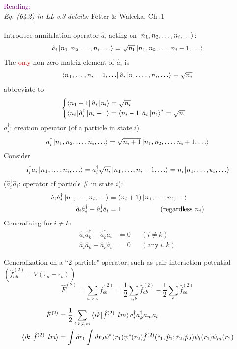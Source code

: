 \documentclass[10pt]{article}
\newcommand{\smallspace}{\hspace{2cm}}
\begin{document}
\noindent \textcolor{purple}{Reading:}\\
\noindent \textit{Eq. (64.2) in LL v.3} \smallspace \textit{details:} Fetter \& Walecka, Ch .1\\ \\
\noindent Introduce annihilation operator $\hat a_i$ acting on $\ket{n_1, n_2,\dots,n_i, \dots}$:
$$
\hat a_i\ket{n_1, n_2, \dots,n_i,\dots} = \sqrt{n_1}\ket{n_1, n_2, \dots, n_i-1,\dots}
$$
The \textcolor{red}{only} non-zero matrix element of $\hat a_i$ is
$$
\bra{n_1, \dots, n_i-1,\dots}\hat a_i \ket{n_1, \dots, n_i, \dots} = \sqrt{n_i}
$$
abbreviate to
\[
\begin{cases}
    \bra{n_1-1}\hat a_i \ket{n_i} = \sqrt{n_i} \\
    \bra{n_i}\hat a_i^\dagger \ket{n_i-1} = \bra{n_i-1}\hat a_i\ket{n_1}^\ast = \sqrt{n_i}
\end{cases}
\]
$a_i^\dagger$: creation operator (of a particle in state $i$)
$$
a_i^\dagger \ket{n_1, n_2, \dots, n_i, \dots} = \sqrt{n_i+1}\ket{n_1, n_2, \dots, n_i+1, \dots}
$$
Consider
$$
a_i^\dagger a_i \ket{n_1, \dots, n_i, \dots} = a_i^\dagger \sqrt{n_i} \ket{n_1, \dots, n_i-1,\dots} = n_i \ket{n_1,\dots,n_i,\dots}
$$
($\hat a_i^\dagger \hat a_i$: operator of particle \# in state $i$):
\begin{align*}
    \hat a_i\hat a_i^\dagger\ket{n_1, \dots, n_i, \dots} &= (n_i+1) \ket{n_1, \dots, n_i, \dots} \\
    \hat a_i \hat a_i^\dagger - \hat a_i^\dagger \hat a_i &= 1 \smallspace \text{(regardless $n_i$)}
\end{align*}
Generalizing for $i\neq k$:
\begin{align*}
    \hat a_i \hat a_k^\dagger - \hat a_k^\dagger a_i &= 0  & &(i\neq k)\\
    \hat a_i \hat a_k - \hat a_k \hat a_i & =0 & &(\text{any } i, k)
\end{align*}
\begin{center}
    \tcbox[nobeforeafter, colframe = red, colback = white]{\([\hat a_i, \hat a_k^\dagger] = \delta_{ik}, \smallspace [\hat a_i, \hat a_k] = 0 \smallspace (\forall \ i,k)\)}
\end{center}
Generalization on a ``2-particle" operator, such as pair interaction potential $(\hat f^{(2)}_{ab} = V(r_a-r_b))$
$$
\hat F^{(2)} = \sum_{a>b}\hat f_{ab}^{(2)} = \frac{1}{2}\sum_{a,b} \hat f_{ab}^{(2)} - \frac{1}{2}\sum_a \hat f_{aa}^{(2)}
$$
\begin{tcolorbox}[colframe = red, colback = white]
    \begin{align*}
        \hat F^{(2)}&= \frac{1}{2}\sum_{i,k,l,m} \bra{ik}\hat f^{(2)} \ket{lm} a_i^\dagger a_k^\dagger a_m a_l \\
        \bra{ik}\hat f^{(2)} \ket{lm} &= \int dr_1 \int dr_2 \psi^\ast(r_1)\psi^\ast(r_2) \hat f^{(2)}(\hat r_1, \hat p_1; \hat r_2, \hat p_2) \psi_l(r_1)\psi_m(r_2)
    \end{align*}
\end{tcolorbox}
\end{document}
